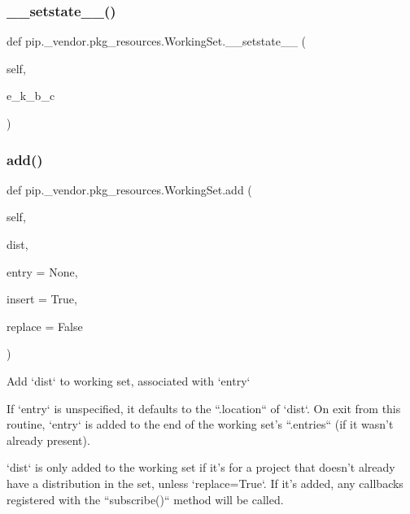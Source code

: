\subsubsection{\texorpdfstring{\+\_\+\+\_\+setstate\+\_\+\+\_\+()}{\_\_setstate\_\_()}}
{\footnotesize\ttfamily def pip.\+\_\+vendor.\+pkg\+\_\+resources.\+Working\+Set.\+\_\+\+\_\+setstate\+\_\+\+\_\+ (\begin{DoxyParamCaption}\item[{}]{self,  }\item[{}]{e\+\_\+k\+\_\+b\+\_\+c }\end{DoxyParamCaption})}

\mbox{\label{classpip_1_1__vendor_1_1pkg__resources_1_1WorkingSet_a721315d2a4a0a3ead71bf8d1b83261ce}} 
\subsubsection{\texorpdfstring{add()}{add()}}
{\footnotesize\ttfamily def pip.\+\_\+vendor.\+pkg\+\_\+resources.\+Working\+Set.\+add (\begin{DoxyParamCaption}\item[{}]{self,  }\item[{}]{dist,  }\item[{}]{entry = {\ttfamily None},  }\item[{}]{insert = {\ttfamily True},  }\item[{}]{replace = {\ttfamily False} }\end{DoxyParamCaption})}

\begin{DoxyVerb}Add `dist` to working set, associated with `entry`

If `entry` is unspecified, it defaults to the ``.location`` of `dist`.
On exit from this routine, `entry` is added to the end of the working
set's ``.entries`` (if it wasn't already present).

`dist` is only added to the working set if it's for a project that
doesn't already have a distribution in the set, unless `replace=True`.
If it's added, any callbacks registered with the ``subscribe()`` method
will be called.
\end{DoxyVerb}
 \mbox{\label{classpip_1_1__vendor_1_1pkg__resources_1_1WorkingSet_a10dbfcb72bfdc7c7b16d764c7002a87d}} 
